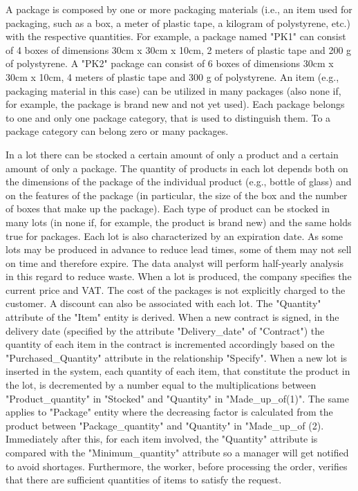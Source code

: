 A package is composed by one or more packaging materials (i.e., an item used for packaging, such as a box, a meter of plastic tape, a kilogram of polystyrene, etc.) with the respective quantities. For example, a package named "PK1" can consist of 4 boxes of dimensions 30cm x 30cm x 10cm, 2 meters of plastic tape and 200 g of polystyrene. A "PK2" package can consist of 6 boxes of dimensions 30cm x 30cm x 10cm, 4 meters of plastic tape and 300 g of polystyrene. An item (e.g., packaging material in this case) can be utilized in many packages (also none if, for example, the package is brand new and not yet used). Each package belongs to one and only one package category, that is used to distinguish them. To a package category can belong zero or many packages.

In a lot there can be stocked a certain amount of only a product and a certain amount of only a package. The quantity of products in each lot depends both on the dimensions of the package of the individual product (e.g., bottle of glass) and on the features of the package (in particular, the size of the box and the number of boxes that make up the package). Each type of product can be stocked in many lots (in none if, for example, the product is brand new) and the same holds true for packages. Each lot is also characterized by an expiration date. As some lots may be produced in advance to reduce lead times, some of them may not sell on time and therefore expire. The data analyst will perform half-yearly analysis in this regard to reduce waste. When a lot is produced, the company specifies the current price and VAT. The cost of the packages is not explicitly charged to the customer. A discount can also be associated with each lot. The "Quantity" attribute of the "Item" entity is derived. When a new contract is signed, in the delivery date (specified by the attribute "Delivery\_date" of "Contract") the quantity of each item in the contract is incremented accordingly based on the "Purchased\_Quantity" attribute in the relationship "Specify". When a new lot is inserted in the system, each quantity of each item, that constitute the product in the lot, is decremented by a number equal to the multiplications between "Product\_quantity" in "Stocked" and "Quantity" in "Made\_up\_of(1)". The same applies to "Package" entity where the decreasing factor is calculated from the product between "Package\_quantity" and "Quantity" in "Made\_up\_of (2). Immediately after this, for each item involved, the "Quantity" attribute is compared with the "Minimum\_quantity" attribute so a manager will get notified to avoid shortages. Furthermore, the worker, before processing the order, verifies that there are sufficient quantities of items to satisfy the request.


